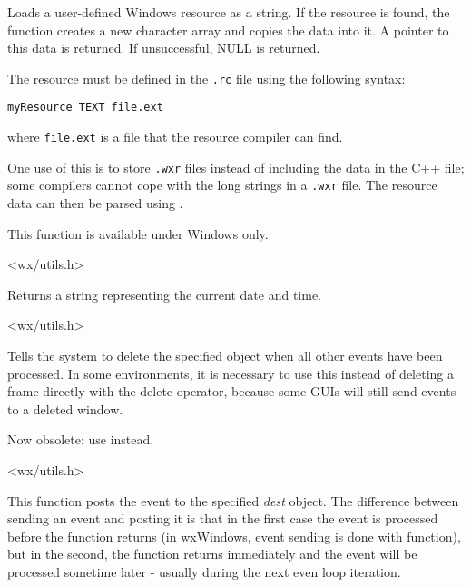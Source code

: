 Loads a user-defined Windows resource as a string. If the resource is found, the function creates
a new character array and copies the data into it. A pointer to this data is returned. If unsuccessful, NULL is returned.

The resource must be defined in the {\tt .rc} file using the following syntax:

\begin{verbatim}
myResource TEXT file.ext
\end{verbatim}

where {\tt file.ext} is a file that the resource compiler can find.

One use of this is to store {\tt .wxr} files instead of including the data in the C++ file; some compilers
cannot cope with the long strings in a {\tt .wxr} file. The resource data can then be parsed
using .

This function is available under Windows only.


<wx/utils.h>

\label{wxnow}


Returns a string representing the current date and time.


<wx/utils.h>

\label{wxpostdelete}


Tells the system to delete the specified object when
all other events have been processed. In some environments, it is
necessary to use this instead of deleting a frame directly with the
delete operator, because some GUIs will still send events to a deleted window.

Now obsolete: use  instead.


<wx/utils.h>

\label{wxpostevent}


This function posts the event to the specified {\it dest} object. The
difference between sending an event and posting it is that in the first case
the event is processed before the function returns (in wxWindows, event sending
is done with  function), but in
the second, the function returns immediately and the event will be processed
sometime later - usually during the next even loop iteration.

